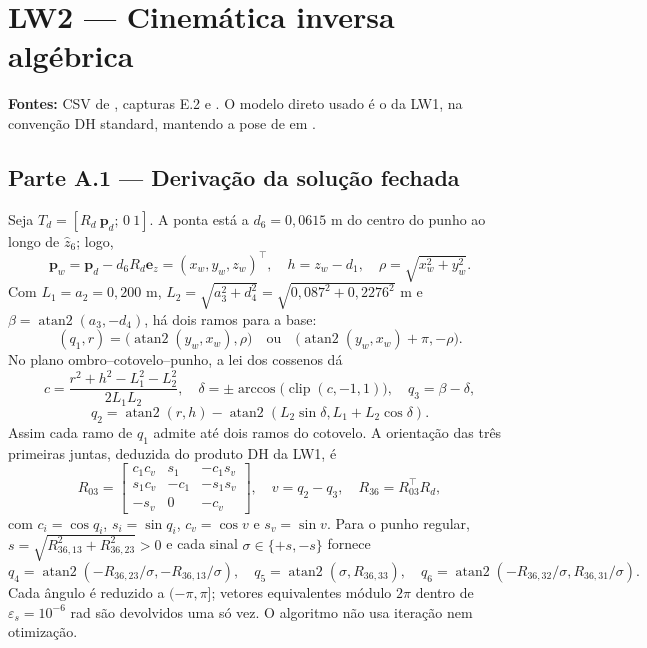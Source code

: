 \clearpage
\section{LW2 — Cinemática inversa algébrica}
\textbf{Fontes:} CSV de , capturas E.2 e . O modelo direto usado é o da LW1, na convenção DH standard, mantendo a pose de  em .

\subsection{Parte A.1 — Derivação da solução fechada}
Seja $T_d=[R_d\ \mathbf p_d;\,0\ 1]$. A ponta está a $d_6=0{,}0615$ m do centro do punho ao longo de $\hat z_6$; logo,
\begin{equation}
\mathbf p_w=\mathbf p_d-d_6R_d\mathbf e_z=(x_w,y_w,z_w)^\top,\quad
h=z_w-d_1,\quad \rho=\sqrt{x_w^2+y_w^2}.
\end{equation}
Com $L_1=a_2=0{,}200$ m, $L_2=\sqrt{a_3^2+d_4^2}=\sqrt{0{,}087^2+0{,}2276^2}$ m e $\beta=\operatorname{atan2}(a_3,-d_4)$, há dois ramos para a base:
\begin{equation}
(q_1,r)=\bigl(\operatorname{atan2}(y_w,x_w),\rho\bigr)
\quad\text{ou}\quad
\bigl(\operatorname{atan2}(y_w,x_w)+\pi,-\rho\bigr).
\end{equation}
No plano ombro--cotovelo--punho, a lei dos cossenos dá
\begin{equation}
c=\frac{r^2+h^2-L_1^2-L_2^2}{2L_1L_2},\quad
\delta=\pm\arccos\bigl(\operatorname{clip}(c,-1,1)\bigr),\quad
q_3=\beta-\delta,
\end{equation}
\begin{equation}
q_2=\operatorname{atan2}(r,h)-\operatorname{atan2}\!\left(L_2\sin\delta,L_1+L_2\cos\delta\right).
\end{equation}
Assim cada ramo de $q_1$ admite até dois ramos do cotovelo. A orientação das três primeiras juntas, deduzida do produto DH da LW1, é
\begin{equation}
R_{03}=\begin{bmatrix}
c_1c_v&s_1&-c_1s_v\\s_1c_v&-c_1&-s_1s_v\\-s_v&0&-c_v
\end{bmatrix},\quad
v=q_2-q_3,\quad R_{36}=R_{03}^{\top}R_d,
\end{equation}
com $c_i=\cos q_i$, $s_i=\sin q_i$, $c_v=\cos v$ e $s_v=\sin v$. Para o punho regular, $s=\sqrt{R_{36,13}^2+R_{36,23}^2}>0$ e cada sinal $\sigma\in\{+s,-s\}$ fornece
\begin{equation}
q_4=\operatorname{atan2}\!\left(-R_{36,23}/\sigma,-R_{36,13}/\sigma\right),\quad
q_5=\operatorname{atan2}(\sigma,R_{36,33}),\quad
q_6=\operatorname{atan2}\!\left(-R_{36,32}/\sigma,R_{36,31}/\sigma\right).
\end{equation}
Cada ângulo é reduzido a $(-\pi,\pi]$; vetores equivalentes módulo $2\pi$ dentro de $\varepsilon_s=10^{-6}$ rad são devolvidos uma só vez. O algoritmo não usa iteração nem otimização.

